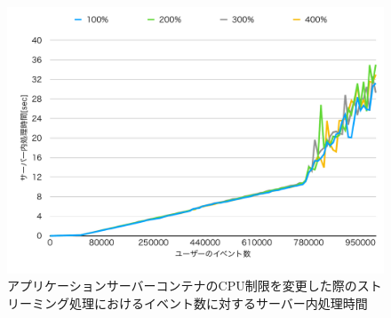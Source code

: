 \documentclass[../../../../../main]{subfiles}
\begin{document}
    \begin{figure}[H]
        \centering
        \includegraphics[width=12cm]{graph}
        \caption{アプリケーションサーバーコンテナのCPU制限を変更した際のストリーミング処理におけるイベント数に対するサーバー内処理時間}
        \label{fig:stream-change-app-cpu-limit-server-time-app_1024-db_1_1024}
    \end{figure}
\end{document}
